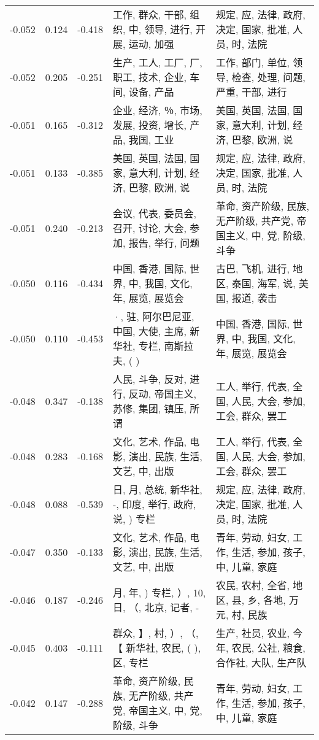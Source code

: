 \begin{tabular}{cccp{5cm}p{5cm}}
-0.052 & 0.124 & -0.418 & 工作, 群众, 干部, 组织, 中, 领导, 进行, 开展, 运动, 加强 & 规定, 应, 法律, 政府, 决定, 国家, 批准, 人员, 时, 法院 \\
-0.052 & 0.205 & -0.251 & 生产, 工人, 工厂, 厂, 职工, 技术, 企业, 车间, 设备, 产品 & 工作, 部门, 单位, 领导, 检查, 处理, 问题, 严重, 干部, 进行 \\
-0.051 & 0.165 & -0.312 & 企业, 经济, ％, 市场, 发展, 投资, 增长, 产品, 我国, 工业 & 美国, 英国, 法国, 国家, 意大利, 计划, 经济, 巴黎, 欧洲, 说 \\
-0.051 & 0.133 & -0.385 & 美国, 英国, 法国, 国家, 意大利, 计划, 经济, 巴黎, 欧洲, 说 & 规定, 应, 法律, 政府, 决定, 国家, 批准, 人员, 时, 法院 \\
-0.051 & 0.240 & -0.213 & 会议, 代表, 委员会, 召开, 讨论, 大会, 参加, 报告, 举行, 问题 & 革命, 资产阶级, 民族, 无产阶级, 共产党, 帝国主义, 中, 党, 阶级, 斗争 \\
-0.050 & 0.116 & -0.434 & 中国, 香港, 国际, 世界, 中, 我国, 文化, 年, 展览, 展览会 & 古巴, 飞机, 进行, 地区, 泰国, 海军, 说, 美国, 报道, 袭击 \\
-0.050 & 0.110 & -0.453 & ·, 驻, 阿尔巴尼亚, 中国, 大使, 主席, 新华社, 专栏, 南斯拉夫, ( ) & 中国, 香港, 国际, 世界, 中, 我国, 文化, 年, 展览, 展览会 \\
-0.048 & 0.347 & -0.138 & 人民, 斗争, 反对, 进行, 反动, 帝国主义, 苏修, 集团, 镇压, 所谓 & 工人, 举行, 代表, 全国, 人民, 大会, 参加, 工会, 群众, 罢工 \\
-0.048 & 0.283 & -0.168 & 文化, 艺术, 作品, 电影, 演出, 民族, 生活, 文艺, 中, 出版 & 工人, 举行, 代表, 全国, 人民, 大会, 参加, 工会, 群众, 罢工 \\
-0.048 & 0.088 & -0.539 & 日, 月, 总统, 新华社, -, 印度, 举行, 政府, 说, ) 专栏 & 规定, 应, 法律, 政府, 决定, 国家, 批准, 人员, 时, 法院 \\
-0.047 & 0.350 & -0.133 & 文化, 艺术, 作品, 电影, 演出, 民族, 生活, 文艺, 中, 出版 & 青年, 劳动, 妇女, 工作, 生活, 参加, 孩子, 中, 儿童, 家庭 \\
-0.046 & 0.187 & -0.246 & 月, 年, ) 专栏, ）, 10, 日, （, 北京, 记者, - & 农民, 农村, 全省, 地区, 县, 乡, 各地, 万元, 村, 民族 \\
-0.045 & 0.403 & -0.111 & 群众, 】, 村, ）, （, 【 新华社, 农民, ( ), 区, 专栏 & 生产, 社员, 农业, 今年, 农民, 公社, 粮食, 合作社, 大队, 生产队 \\
-0.042 & 0.147 & -0.288 & 革命, 资产阶级, 民族, 无产阶级, 共产党, 帝国主义, 中, 党, 阶级, 斗争 & 青年, 劳动, 妇女, 工作, 生活, 参加, 孩子, 中, 儿童, 家庭 \\

\end{tabular}
